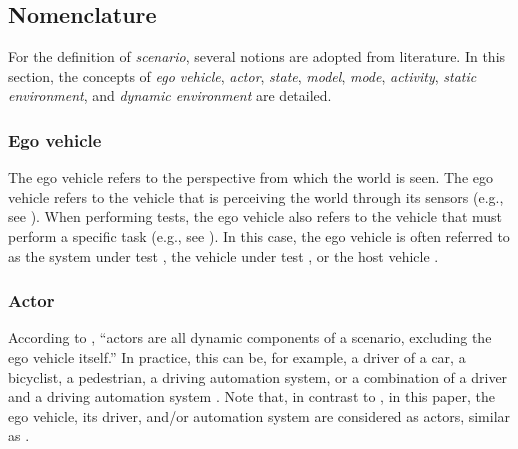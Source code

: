 


\subsection{Nomenclature}
\label{sec:nomenclature}

For the definition of \emph{scenario}, several notions are adopted from literature. In this section, the concepts of \emph{ego vehicle}, \emph{actor}, \emph{state}, \emph{model}, \emph{mode}, \emph{activity}, \emph{static environment}, and \emph{dynamic environment} are detailed. 

\subsubsection{Ego vehicle}
\label{sec:ego vehicle}
The ego vehicle refers to the perspective from which the world is seen. The ego vehicle refers to the vehicle that is perceiving the world through its sensors (e.g., see \cite{Bonnin2014}). When performing tests, the ego vehicle also refers to the vehicle that must perform a specific task (e.g., see \cite{althoff2017CommonRoad}). In this case, the ego vehicle is often referred to as the system under test \cite{stellet2015taxonomy}, the vehicle under test \cite{gietelink2006development}, or the host vehicle \cite{gietelink2006development}.

\subsubsection{Actor}
\label{sec:actor}
\cbstart
According to \textcite{catapult2018musicc}, ``actors are all dynamic components of a scenario, excluding the ego vehicle itself.'' In practice, this can be, for example, a driver of a car, a bicyclist, a pedestrian, a driving automation system, or a combination of a driver and a driving automation system \cite{geyer2014}. Note that, in contrast to \cite{catapult2018musicc}, in this paper, the ego vehicle, its driver, and/or automation system are considered as actors, similar as \cite{geyer2014}.%
\cbend

